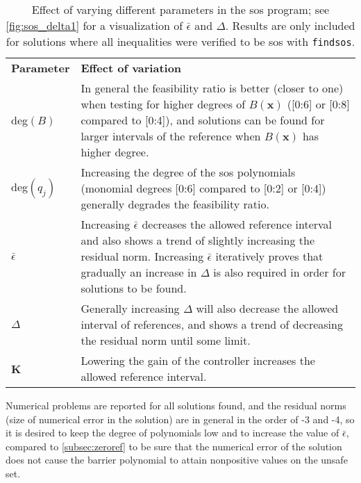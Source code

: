 
\begin{table}[htbp]
\begin{tabularx}{\textwidth}{l X}
\rowcolor{HeaderBlue}
\textbf{Parameter} & \textbf{Effect of variation}\\
deg$(B)$ & In general the feasibility ratio is better (closer to one) when testing for higher degrees of $B(\mathbf{x})$ ([0:6] or [0:8] compared to [0:4]), and solutions can be found for larger intervals of the reference when $B(\mathbf{x})$ has higher degree.\\
\rowcolor{textBlue}
deg$(q_j)$ & Increasing the degree of the \gls{sos} polynomials (monomial degrees [0:6] compared to [0:2] or [0:4]) generally degrades the feasibility ratio.\\
$\bar{\epsilon}$ & Increasing $\bar{\epsilon}$ decreases the allowed reference interval and also shows a trend of slightly increasing the residual norm. Increasing $\bar{\epsilon}$ iteratively proves that gradually an increase in $\Delta$ is also required in order for solutions to be found. \\
\rowcolor{textBlue}
$\Delta$ & Generally increasing $\Delta$ will also decrease the allowed interval of references, and shows a trend of decreasing the residual norm until some limit.\\
\textbf{K} & Lowering the gain of the controller increases  the allowed reference interval.
\end{tabularx}
\caption{Effect of varying different parameters in the \gls{sos} program; see \autoref{fig:sos_delta1} for a visualization of $\bar{\epsilon}$ and $\Delta$. Results are only included for solutions where all inequalities were verified to be \gls{sos} with \texttt{findsos}.}
\label{tab:sostools_varying_param}
\end{table}

Numerical problems are reported for all solutions found, and the residual norms (size of numerical error in the solution) are in general in the order of -3 and -4, so it is desired to keep the degree of polynomials low and to increase the value of $\bar{\epsilon}$, compared to \autoref{subsec:zeroref} to be sure that the numerical error of the solution does not cause the barrier polynomial to attain nonpositive values on the unsafe set. 



